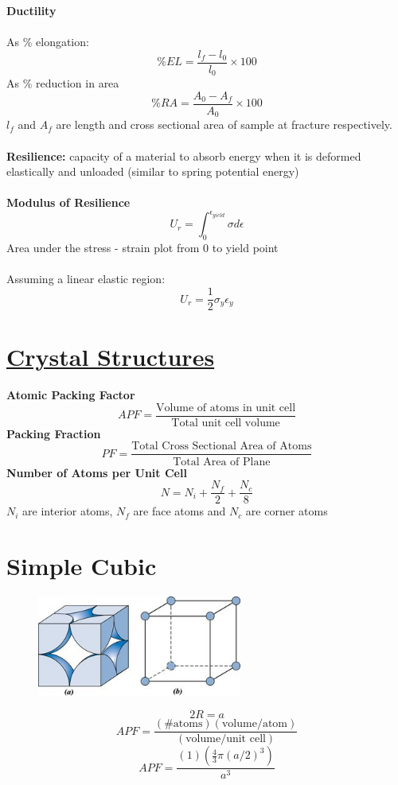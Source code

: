 \documentclass[12pt]{article}
\begin{document}
\noindent\textbf{Ductility}\\\\
As $\%$ elongation:
\[\%EL = \frac{l_f - l_0}{l_0} \times 100\]
As $\%$ reduction in area
\[\%RA = \frac{A_0 - A_f}{A_0} \times 100\]
$l_f$ and $A_f$ are length and cross sectional area of sample at fracture respectively.\\\\
\noindent\textbf{Resilience:} capacity of a material to absorb energy when it is deformed elastically and unloaded (similar to spring potential energy)\\\\
\noindent\textbf{Modulus of Resilience}
\[U_r = \int_{0}^{\epsilon_{yield}}\sigma d\epsilon\]
Area under the stress - strain plot from 0 to yield point\\\\
Assuming a linear elastic region:
\[U_r=\frac{1}{2}\sigma_y\epsilon_y\]
\newpage
\section*{\LARGE\underline{Crystal Structures}}
\noindent\textbf{Atomic Packing Factor}
\[ APF = \frac{\text{Volume of atoms in unit cell}}{\text{Total unit cell volume}}\]
\noindent\textbf{Packing Fraction}
\[PF=\frac{\text{Total Cross Sectional Area of Atoms}}{\text{Total Area of Plane}}\]
\noindent\textbf{Number of Atoms per Unit Cell}
\[N=N_i+\frac{N_f}{2}+\frac{N_c}{8}\]
$N_i$ are interior atoms, $N_f$ are face atoms and $N_c$ are corner atoms
\section*{Simple Cubic}
\begin{figure}[H]
    \centering
    \includegraphics[width=0.6\textwidth]{SC.jpg}
\end{figure}
\[2R=a\]
\[APF=\frac{(\text{\# atoms})(\text{volume/atom})}{(\text{volume/unit cell})}\]
\[APF=\frac{(1)(\frac{4}{3}\pi(a/2)^3)}{a^3}\]
\end{document}
